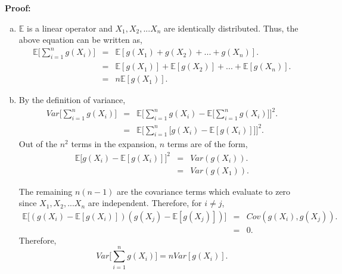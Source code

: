 \documentclass[a4paper,english,12pt]{article}
\begin{document}
\textbf{Proof:}
\begin{enumerate}[a)]
\item{
$\mathbb{E}$ is a linear operator and $X_1, X_2, ... X_n$ are identically distributed. Thus, the above equation can be written as,
\begin{eqnarray}
\mathbb{E}\Big[ \sum_{i=1}^{n} g(X_i) \Big] &=& \mathbb{E}[ g(X_1) + g(X_2) + ... + g(X_n) ].\nonumber \\
&=& \mathbb{E}[g(X_1)] + \mathbb{E}[g(X_2)] + ... + \mathbb{E}[g(X_n)].\nonumber \\
&=& n \mathbb{E}[g(X_1)].
\end{eqnarray}
}

\item{By the definition of variance,
\begin{eqnarray}
Var\Big[ \sum_{i=1}^{n} g(X_i) \Big] &=& \mathbb{E} \Bigg[ \sum_{i=1}^{n} g(X_i) - \mathbb{E} \Big[ \sum_{i=1}^{n} g(X_i)\Big] \Bigg]^2. \nonumber \\
&=& \mathbb{E} \Bigg[ \sum_{i=1}^{n} \Big[ g(X_i) - \mathbb{E}[ g(X_i)]\Big] \Bigg]^2.
\end{eqnarray}
}
Out of the $n ^2$ terms in the expansion, $n$ terms are of the form,
\begin{eqnarray}
\mathbb{E}\Big[ g(X_i) - \mathbb{E}[ g(X_i)]\Big]^2 &=& Var (g(X_i)).\nonumber \\
&=& Var(g(X_1)). 
\end{eqnarray}

The remaining $n(n-1)$ are the covariance terms which evaluate to zero since $X_1, X_2,...X_n$ are independent. Therefore, for $i \neq j$,
\begin{eqnarray}
\mathbb{E}\Big[(g(X_i) - \mathbb{E}[ g(X_i)])(g(X_j) - \mathbb{E}[ g(X_j)])\Big] &=& Cov(g(X_i), g(X_j)). \nonumber \\
&=& 0.
\end{eqnarray}
Therefore,
\begin{equation}
Var \Big[ \sum_{i=1}^{n} g(X_i) \Big] = n Var[g(X_i)].
\end{equation}
\end{enumerate}
\end{document}
